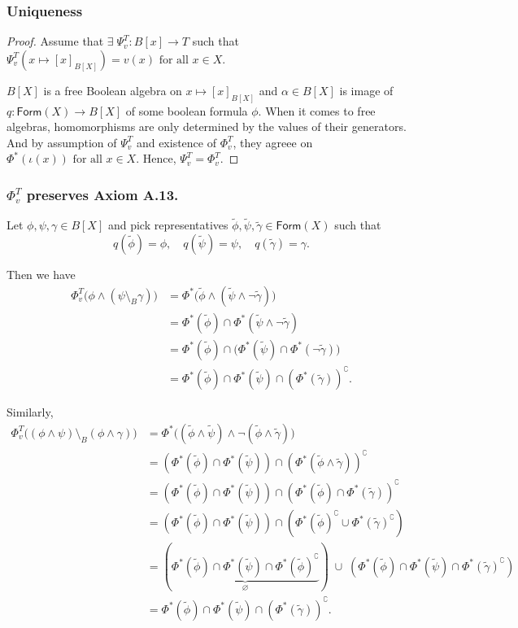 \subsubsection*{Uniqueness}
\begin{proof}
Assume that $\exists\;\Psi_v^T:B[x]\rightarrow T$ such that $\Psi_v^T(x\mapsto [x]_{B[X]})=v(x)\text{ for all }x \in X$.

$B[X]$ is a free Boolean algebra on $x\mapsto [x]_{B[X]}$  and $\alpha \in B[X]$ is image of $q:\mathsf{Form}(X)\rightarrow B[X]$ of some boolean formula $\phi$. 
When it comes to free algebras, homomorphisms are only determined by the values of their generators. 
And by assumption of $\Psi_v^T$ and existence of $\Phi_v^T$, they agreee on $\Phi^*(\iota(x)) \text{ for all } x \in X$. Hence, $\Psi_v^T=\Phi_v^T$.
\end{proof}

\subsubsection*{$\Phi_v^T$ preserves Axiom A.13.}

Let $\phi, \psi, \gamma \in B[X]$ and pick representatives $\tilde{\phi}, \tilde{\psi}, \tilde{\gamma} \in \mathsf{Form}(X)$ such that
\[
q(\tilde{\phi}) = \phi, \quad q(\tilde{\psi}) = \psi, \quad q(\tilde{\gamma}) = \gamma.
\]

Then we have
\[
\begin{aligned}
\Phi_v^T\big(\phi \wedge (\psi \setminus_B \gamma)\big) 
&= \Phi^*\big(\tilde{\phi} \wedge (\tilde{\psi} \wedge \neg \tilde{\gamma})\big) \\
&= \Phi^*(\tilde{\phi}) \cap \Phi^*(\tilde{\psi} \wedge \neg \tilde{\gamma}) \\
&= \Phi^*(\tilde{\phi}) \cap \big(\Phi^*(\tilde{\psi}) \cap \Phi^*(\neg \tilde{\gamma})\big) \\
&= \Phi^*(\tilde{\phi}) \cap \Phi^*(\tilde{\psi}) \cap (\Phi^*(\tilde{\gamma}))^\complement.
\end{aligned}
\]

Similarly,
\[
\begin{aligned}
\Phi_v^T\big((\phi \wedge \psi) \setminus_B (\phi \wedge \gamma)\big) 
&= \Phi^*\big((\tilde{\phi} \wedge \tilde{\psi}) \wedge \neg (\tilde{\phi} \wedge \tilde{\gamma})\big) \\
&= (\Phi^*(\tilde{\phi}) \cap \Phi^*(\tilde{\psi})) \cap (\Phi^*(\tilde{\phi} \wedge \tilde{\gamma}))^\complement \\
&= (\Phi^*(\tilde{\phi}) \cap \Phi^*(\tilde{\psi})) \cap (\Phi^*(\tilde{\phi}) \cap \Phi^*(\tilde{\gamma}))^\complement \\
&= (\Phi^*(\tilde{\phi}) \cap \Phi^*(\tilde{\psi})) \cap (\Phi^*(\tilde{\phi})^\complement \cup \Phi^*(\tilde{\gamma})^\complement) \\
&= (\underbrace{\Phi^*(\tilde{\phi}) \cap \Phi^*(\tilde{\psi}) \cap \Phi^*(\tilde{\phi})^\complement}_{\varnothing}) 
   \;\cup\; (\Phi^*(\tilde{\phi}) \cap \Phi^*(\tilde{\psi}) \cap \Phi^*(\tilde{\gamma})^\complement) \\
&= \Phi^*(\tilde{\phi}) \cap \Phi^*(\tilde{\psi}) \cap (\Phi^*(\tilde{\gamma}))^\complement.
\end{aligned}
\]

